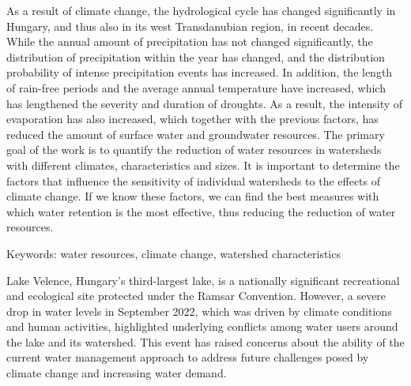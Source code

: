 \noindent

As a result of climate change, the hydrological cycle has changed significantly in Hungary, and thus also in its west Transdanubian region, in recent decades. While the annual amount of precipitation has not changed significantly, the distribution of precipitation within the year has changed, and the distribution probability of intense precipitation events has increased. In addition, the length of rain-free periods and the average annual temperature have increased, which has lengthened the severity and duration of droughts. As a result, the intensity of evaporation has also increased, which together with the previous factors, has reduced the amount of surface water and groundwater resources.
The primary goal of the work is to quantify the reduction of water resources in watersheds with different climates, characteristics and sizes. It is important to determine the factors that influence the sensitivity of individual watersheds to the effects of climate change. If we know these factors, we can find the best measures with which water retention is the most effective, thus reducing the reduction of water resources.

Keywords: water resources, climate change, watershed characteristics

\newpage{}
{}
\begin{flushleft}





\end{flushleft}

\noindent

Lake Velence, Hungary's third-largest lake, is a nationally significant recreational and ecological site protected under the Ramsar Convention. However, a severe drop in water levels in September 2022, which was driven by climate conditions and human activities, highlighted underlying conflicts among water users around the lake and its watershed. This event has raised concerns about the ability of the current water management approach to address future challenges posed by climate change and increasing water demand. 


